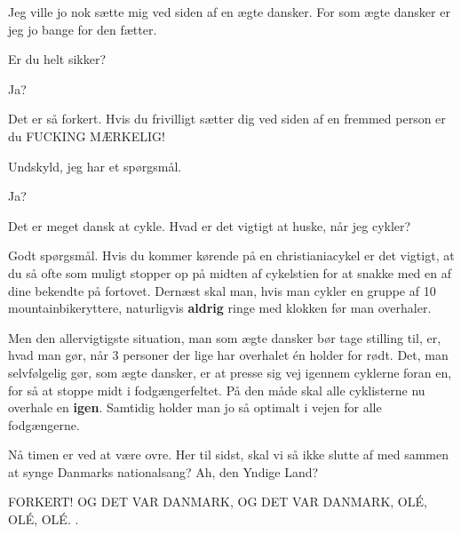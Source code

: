 \documentclass[a4paper,11pt]{article}
\begin{document}
\begin{sketch}
  Jeg ville jo nok sætte mig ved siden af en ægte dansker. For som ægte dansker er jeg jo bange for den fætter.

Er du  helt sikker?

  Ja?

  Det er så forkert. %
 Hvis du frivilligt sætter dig ved siden af en fremmed person er du  FUCKING MÆRKELIG!

  Undskyld, jeg har et spørgsmål.

  Ja?

 Det er meget dansk at cykle. Hvad er det vigtigt at huske, når jeg cykler? 

  Godt spørgsmål.
Hvis du kommer kørende på en christianiacykel er det vigtigt, at du så ofte som muligt
stopper op på midten af cykelstien for at snakke med en af dine bekendte på fortovet.
Dernæst skal man, hvis man cykler en gruppe af 10 mountainbikeryttere,
naturligvis \textbf{aldrig} ringe med klokken før man overhaler.

 Men den allervigtigste situation, man som ægte dansker bør tage stilling til,
er, hvad man gør, når 3 personer der lige har overhalet én holder for rødt.
Det, man selvfølgelig gør, som ægte dansker, er at presse sig vej igennem cyklerne foran en,
for så at stoppe midt i fodgængerfeltet. På den måde skal alle cyklisterne nu overhale en \textbf{igen}.
 Samtidig holder man jo så optimalt i vejen for alle fodgængerne.


 Nå timen er ved at være ovre. Her til sidst, skal vi så ikke slutte af med sammen at synge Danmarks nationalsang?
  Ah, den Yndige Land?  %

  FORKERT! 
OG DET VAR DANMARK, OG DET VAR DANMARK, OLÉ, OLÉ, OLÉ. .


\end{sketch}
\end{document}
